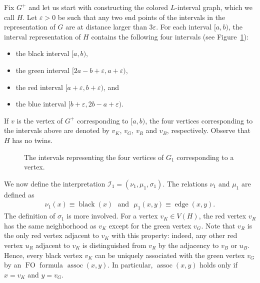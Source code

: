 \documentclass{CSML}
\def\prebox#1{\mathop{\mbox{#1}}}
\newcommand{\FO}{\ensuremath{\operatorname{FO}}\xspace}
\newcommand{\cI}{\mathcal{I}}
\theoremstyle{plain}\newtheorem{claim}[thm]{Claim}
\begin{document}
Fix $G^+$ and let us start with constructing the colored $L$-interval graph, which we call $H$.
Let $\varepsilon>0$ be such that any two end points of the intervals
in the representation of $G$ are at distance larger than $3\varepsilon$.
For each interval $[a,b)$, the interval representation of $H$ contains the following four intervals (see Figure~\ref{fig:colorful}):
\begin{itemize}
\item the black interval $[a,b)$,
\item the green interval $[2a-b+\varepsilon,a+\varepsilon)$,
\item the red interval $[a+\varepsilon,b+\varepsilon)$, and
\item the blue interval $[b+\varepsilon,2b-a+\varepsilon)$.
\end{itemize}
If $v$ is the vertex of $G^+$ corresponding to $[a,b)$, the four vertices corresponding to the intervals above
are denoted by $v_K$, $v_G$, $v_R$ and $v_B$, respectively. Observe that $H$ has no twins.

\begin{figure}[!htbp]
  \centering

  
  \caption{The intervals representing the four vertices of $G_1$ corresponding to a vertex.}
  \label{fig:colorful}
\end{figure}

We now define the interpretation $\cI_1=(\nu_1,\mu_1,\sigma_1)$.
The relations $\nu_1$ and $\mu_1$ are defined as
\begin{align}\label{eq:numupred}
\nu_1(x)\equiv \prebox{black}(x) \mbox{~~and~~}
	\mu_1(x,y)\equiv \prebox{edge}(x,y)
.\end{align}
The definition of $\sigma_1$ is more involved.
For a vertex $v_K\in V(H)$, the red vertex $v_R$ has the same neighborhood as $v_K$ except for the green vertex $v_G$.
Note that $v_R$ is the only red vertex adjacent to $v_K$ with this property: indeed,
any other red vertex $u_R$ adjacent to $v_K$ is distinguished from $v_R$ by the adjacency to $v_B$ or $u_B$.
Hence, every black vertex $v_K$ can be uniquely associated with the green vertex $v_G$ by an \FO formula $\prebox{assoc}(x,y)$.
In particular, $\prebox{assoc}(x,y)$ holds only if $x=v_K$ and $y=v_G$.
\end{document}
